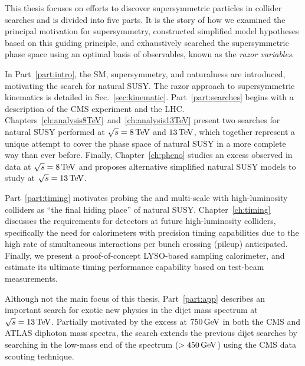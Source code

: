 This thesis focuses on efforts to discover supersymmetric
particles in collider searches and is divided into five parts. It is
the story of how we examined the principal motivation for supersymmetry,
constructed simplified model hypotheses based on this guiding
principle, and exhaustively searched the supersymmetric phase space
using an optimal basis of observables, known as the \emph{razor variables}.

In Part~\ref{part:intro}, the SM, supersymmetry, and naturalness are
introduced, motivating the search for natural SUSY. The razor approach
to supersymmetric kinematics is detailed in
Sec.~\ref{sec:kinematic}. Part~\ref{part:searches} begins with a description of the CMS
experiment and the LHC. Chapters~\ref{ch:analysis8TeV}~and~\ref{ch:analysis13TeV} present
two searches for natural SUSY performed at $\sqrt{s}=8
\,\text{Te\hspace{-.08em}V}$ and $13 \,\text{Te\hspace{-.08em}V}$, which together represent a unique attempt to cover the phase space of
natural SUSY in a more complete way than ever before. Finally,
Chapter~\ref{ch:pheno} studies an excess observed in data at $\sqrt{s}=8
\,\text{Te\hspace{-.08em}V}$ and proposes alternative simplified natural SUSY models to study
at $\sqrt{s}=13 \,\text{Te\hspace{-.08em}V}$. 

Part~\ref{part:timing} motivates probing the \TeV and multi-\TeV scale
with high-luminosity colliders as ``the final hiding place'' of
natural SUSY. Chapter~\ref{ch:timing} discusses the
requirements for detectors at future high-luminosity colliders,
specifically the need for calorimeters with precision
timing capabilities due to the high rate of simultaneous interactions
per bunch crossing (pileup) anticipated. Finally, we present a
proof-of-concept LYSO-based sampling calorimeter, and estimate its
ultimate timing performance capability based on test-beam
measurements.

Although not the main focus of this thesis, Part~\ref{part:app}
describes an important search for exotic new physics in the dijet mass
spectrum at $\sqrt{s}=13 \,\text{Te\hspace{-.08em}V}$. Partially motivated by
the excess at $750 \,\text{Ge\hspace{-.08em}V}$ in both the CMS and ATLAS diphoton mass
spectra, the search extends the previous dijet searches by searching
in the low-mass end of the spectrum ($>450 \,\text{Ge\hspace{-.08em}V}$) using the
CMS data scouting technique.